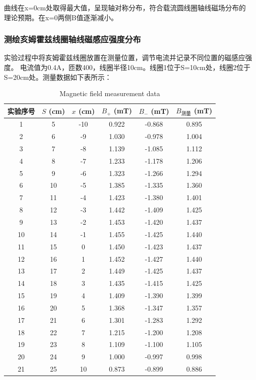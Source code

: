 \documentclass[10pt,a4paper]{ctexart}
\begin{document}
曲线在x=0cm处取得最大值，呈现轴对称分布，符合载流圆线圈轴线磁场分布的理论预期。在x=0两侧B值逐渐减小。


    \subsubsection{测绘亥姆霍兹线圈轴线磁感应强度分布}
    实验过程中将亥姆霍兹线圈放置在测量位置，调节电流并记录不同位置的磁感应强度。
    电流值为0.4A，匝数400，线圈半径10cm。线圈1位于S=10cm处，线圈2位于S=20cm处。测量数据如下表所示：
    \begin{table}[H]
\centering
\caption{Magnetic field measurement data}
\label{tab:magnetic_field}
\begin{tabular}{|c|c|c|c|c|c|}
\hline
实验序号 & $S$ (cm) & $x$ (cm) & $B_+$ (mT) & $B_-$ (mT) & $B_{\text{测量}}$ (mT) \\
\hline
1 & 5 & -10 & 0.922 & -0.868 & 0.895 \\
2 & 6 & -9 & 1.030 & -0.978 & 1.004 \\
3 & 7 & -8 & 1.139 & -1.085 & 1.112 \\
4 & 8 & -7 & 1.233 & -1.178 & 1.206 \\
5 & 9 & -6 & 1.323 & -1.266 & 1.294 \\
6 & 10 & -5 & 1.385 & -1.335 & 1.360 \\
7 & 11 & -4 & 1.423 & -1.380 & 1.401 \\
8 & 12 & -3 & 1.442 & -1.409 & 1.425 \\
9 & 13 & -2 & 1.453 & -1.420 & 1.437 \\
10 & 14 & -1 & 1.455 & -1.425 & 1.440 \\
11 & 15 & 0 & 1.450 & -1.423 & 1.437 \\
12 & 16 & 1 & 1.452 & -1.427 & 1.440 \\
13 & 17 & 2 & 1.449 & -1.425 & 1.437 \\
14 & 18 & 3 & 1.435 & -1.415 & 1.425 \\
15 & 19 & 4 & 1.409 & -1.390 & 1.399 \\
16 & 20 & 5 & 1.368 & -1.347 & 1.357 \\
17 & 21 & 6 & 1.301 & -1.283 & 1.292 \\
18 & 22 & 7 & 1.215 & -1.200 & 1.208 \\
19 & 23 & 8 & 1.109 & -1.100 & 1.105 \\
20 & 24 & 9 & 1.000 & -0.997 & 0.998 \\
21 & 25 & 10 & 0.873 & -0.899 & 0.886 \\
\hline
\end{tabular}
\end{table}
\end{document}
